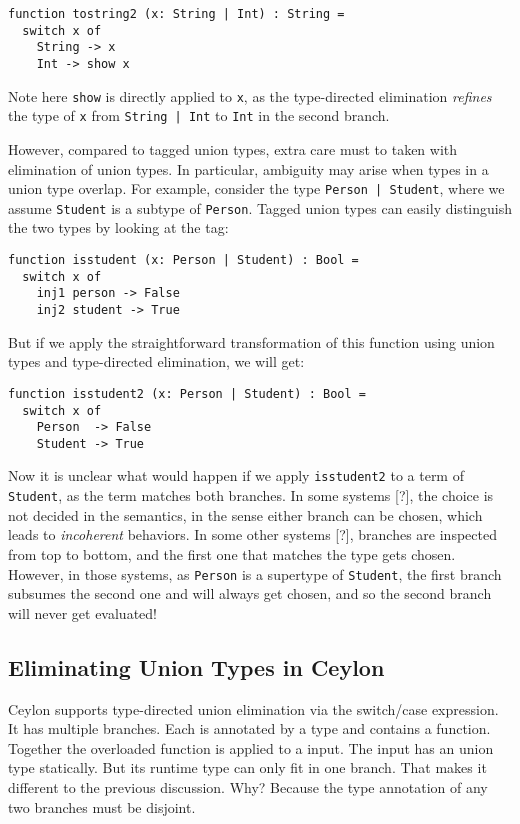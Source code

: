 \begin{lstlisting}
function tostring2 (x: String | Int) : String =
  switch x of
    String -> x
    Int -> show x
\end{lstlisting}

\noindent Note here \lstinline{show} is directly applied to \lstinline{x}, as
the type-directed elimination \textit{refines} the type of \lstinline{x} from
\lstinline{String | Int} to \lstinline{Int} in the second branch.

However, compared to tagged union types, extra care must to taken with
elimination of union types. In particular, ambiguity may arise when types in a
union type overlap. For example, consider the type \lstinline{Person | Student},
where we assume \lstinline{Student} is a subtype of \lstinline{Person}. Tagged
union types can easily distinguish the two types by looking at the tag:

\begin{lstlisting}
function isstudent (x: Person | Student) : Bool =
  switch x of
    inj1 person -> False
    inj2 student -> True
\end{lstlisting}

But if we apply the straightforward transformation of this function using union
types and type-directed elimination, we will get:

\begin{lstlisting}
function isstudent2 (x: Person | Student) : Bool =
  switch x of
    Person  -> False
    Student -> True
\end{lstlisting}

\noindent Now it is unclear what would happen if we apply \lstinline{isstudent2}
to a term of \lstinline{Student}, as the term matches both branches. In some
systems [?], the choice is not decided in the semantics, in the sense either
branch can be chosen, which leads to \textit{incoherent} behaviors. In some
other systems [?], branches are inspected from top to bottom, and the first one
that matches the type gets chosen. However, in those systems, as
\lstinline{Person} is a supertype of \lstinline{Student}, the first branch
subsumes the second one and will always get chosen, and so the second branch
will never get evaluated!


\subsection{Eliminating Union Types in Ceylon}
Ceylon supports type-directed union elimination via the switch/case expression.
It has multiple branches. Each is annotated by a type and contains a function.
Together the overloaded function is applied to a input.
The input has an union type statically.
But its runtime type can only fit in one branch.
That makes it different to the previous discussion. Why?
Because the type annotation of any two branches must be disjoint.

